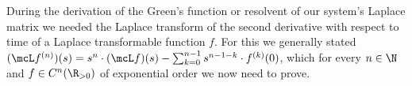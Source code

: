 During the derivation of the Green's function or resolvent of our system's Laplace matrix we needed the Laplace transform of the second derivative with respect to time of a Laplace transformable function $f$. For this we generally stated $(\mcL f^{(n)})(s) = s^n\cdot(\mcL f)(s) - \sum_{k=0}^{n-1}s^{n-1-k}\cdot f^{(k)}(0)$, which for every $n\in\N$ and $f\in C^n(\R_{>0})$ of exponential order we now need to prove.


% 


